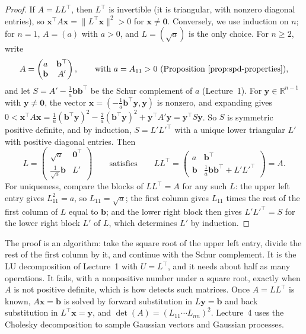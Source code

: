 \documentclass[11pt]{article}
\newcommand{\py}[1]{\texttt{\detokenize{#1}}}
\newcommand{\norm}[1]{\lVert #1 \rVert}
\theoremstyle{definition}
\theoremstyle{plain}
\theoremstyle{remark}
\begin{document}
\begin{proof}
    If $A = LL^\top$, then $L^\top$ is invertible (it is triangular, with nonzero diagonal entries), so $\mathbf{x}^\top A\mathbf{x} = \norm{L^\top\mathbf{x}}^2 > 0$ for $\mathbf{x} \neq \mathbf{0}$. Conversely, we use induction on $n$; for $n = 1$, $A = (a)$ with $a > 0$, and $L = (\sqrt{a})$ is the only choice. For $n \geq 2$, write
    \[A = \begin{pmatrix} a & \mathbf{b}^\top \\ \mathbf{b} & A' \end{pmatrix}, \qquad \text{with } a = A_{11} > 0 \text{ (Proposition~\ref{prop:spd-properties})},\]
    and let $S = A' - \frac{1}{a}\mathbf{b}\mathbf{b}^\top$ be the Schur complement of $a$ (Lecture~1). For $\mathbf{y} \in \mathbb{R}^{n-1}$ with $\mathbf{y} \neq \mathbf{0}$, the vector $\mathbf{x} = (-\frac{1}{a}\mathbf{b}^\top\mathbf{y}, \mathbf{y})$ is nonzero, and expanding gives $0 < \mathbf{x}^\top A\mathbf{x} = \frac{1}{a}(\mathbf{b}^\top\mathbf{y})^2 - \frac{2}{a}(\mathbf{b}^\top\mathbf{y})^2 + \mathbf{y}^\top A'\mathbf{y} = \mathbf{y}^\top S\mathbf{y}$. So $S$ is symmetric positive definite, and by induction, $S = L'L'^\top$ with a unique lower triangular $L'$ with positive diagonal entries. Then
    \[L = \begin{pmatrix} \sqrt{a} & \mathbf{0}^\top \\ \frac{1}{\sqrt{a}}\mathbf{b} & L' \end{pmatrix} \qquad \text{satisfies} \qquad LL^\top = \begin{pmatrix} a & \mathbf{b}^\top \\ \mathbf{b} & \frac{1}{a}\mathbf{b}\mathbf{b}^\top + L'L'^\top \end{pmatrix} = A.\]
    For uniqueness, compare the blocks of $LL^\top = A$ for any such $L$: the upper left entry gives $L_{11}^2 = a$, so $L_{11} = \sqrt{a}$; the first column gives $L_{11}$ times the rest of the first column of $L$ equal to $\mathbf{b}$; and the lower right block then gives $L'L'^\top = S$ for the lower right block $L'$ of $L$, which determines $L'$ by induction.
\end{proof}

The proof is an algorithm: take the square root of the upper left entry, divide the rest of the first column by it, and continue with the Schur complement. It is the LU decomposition of Lecture~1 with $U = L^\top$, and it needs about half as many operations. It fails, with a nonpositive number under a square root, exactly when $A$ is not positive definite, which is how \py{np.linalg.cholesky} detects such matrices. Once $A = LL^\top$ is known, $A\mathbf{x} = \mathbf{b}$ is solved by forward substitution in $L\mathbf{y} = \mathbf{b}$ and back substitution in $L^\top\mathbf{x} = \mathbf{y}$, and $\det(A) = (L_{11} \cdots L_{nn})^2$. Lecture~4 uses the Cholesky decomposition to sample Gaussian vectors and Gaussian processes.
\end{document}
